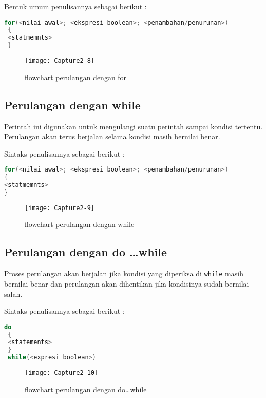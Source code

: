 Bentuk umum penulisannya sebagai berikut :

\begin{lstlisting}[language=c++, numbers=none]
 for(<nilai_awal>; <ekspresi_boolean>; <penambahan/penurunan>)
 {
 <statmemnts>
 }
\end{lstlisting}

\begin{figure}[htbp]
\centering
\texttt{[image: Capture2-8]}
\caption{flowchart perulangan dengan for}
\end{figure}

\subsection{Perulangan dengan while}\label{perulangan-dengan-while}

Perintah ini digunakan untuk mengulangi suatu perintah sampai kondisi
tertentu. Perulangan akan terus berjalan selama kondisi masih bernilai
benar.

Sintaks penulisannya sebagai berikut :

\begin{lstlisting}[language=c++, numbers=none]
for(<nilai_awal>; <ekspresi_boolean>; <penambahan/penurunan>)
{
<statmemnts>
}
\end{lstlisting}

\begin{figure}[htbp]
\centering
\texttt{[image: Capture2-9]}
\caption{flowchart perulangan dengan while}
\end{figure}

\subsection{Perulangan dengan do \dots while}\label{perulangan-dengan-do-while}

Proses perulangan akan berjalan jika kondisi yang diperiksa di
\texttt{while} masih bernilai benar dan perulangan akan dihentikan jika
kondisinya sudah bernilai salah.

Sintaks penulisannya sebagai berikut :

\begin{lstlisting}[language=c++, numbers=none]
 do
 {
 <statements>
 }
 while(<expresi_boolean>)
\end{lstlisting}

\begin{figure}[htbp]
\centering
\texttt{[image: Capture2-10]}
\caption{flowchart perulangan dengan do\dots while}
\end{figure}


